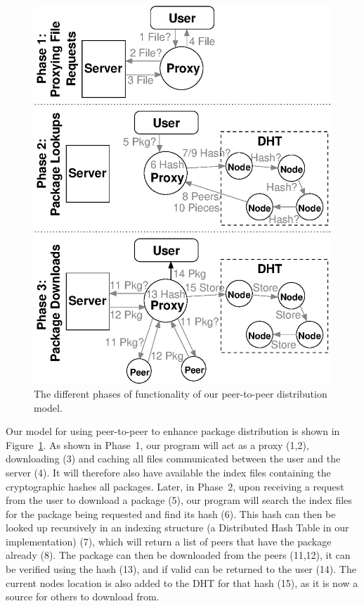 \documentclass[conference]{IEEEtran}
\begin{document}
\begin{figure}
\centering
\includegraphics[width=0.9\columnwidth]{model_simple.eps}
\caption{The different phases of functionality of our peer-to-peer distribution model.}
\label{model}
\end{figure}

Our model for using peer-to-peer to enhance package distribution is shown in
Figure~\ref{model}. As shown in Phase~1, our program will act as a
proxy (1,2), downloading (3) and caching all files communicated
between the user and the server (4). It will therefore also have
available the index files containing the cryptographic hashes all
packages. Later, in Phase~2, upon receiving a request from the user
to download a package (5), our program will search the index files
for the package being requested and find its hash (6). This hash can
then be looked up recursively in an indexing structure (a Distributed Hash Table in our implementation) (7), which will return a
list of peers that have the package already (8). The package can
then be downloaded from the peers (11,12), it can be verified using
the hash (13), and if valid can be returned to the user (14). The
current nodes location is also added to the DHT for that hash (15),
as it is now a source for others to download from.
\end{document}
